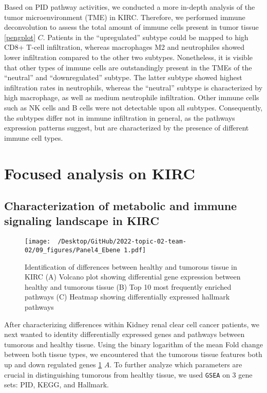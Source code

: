 \documentclass[
  parskip,
  oneside]{scrreprt}
\begin{document}
Based on PID pathway activities, we conducted a more in-depth analysis
of the tumor microenvironment (TME) in KIRC. Therefore, we performed
immune deconvolution to assess the total amount of immune cells present
in tumor tissue \cref{pengplot} \(C\). Patients in the ``upregulated''
subtype could be mapped to high CD8+ T-cell infiltration, whereas
macrophages M2 and neutrophiles showed lower infiltration compared to
the other two subtypes. Nonetheless, it is visible that other types of
immune cells are outstandingly present in the TMEs of the ``neutral''
and ``downregulated'' subtype. The latter subtype showed highest
infiltration rates in neutrophils, whereas the ``neutral'' subtype is
characterized by high macrophage, as well as medium neutrophile
infiltration. Other immune cells such as NK cells and B cells were not
detectable upon all subtypes. Consequently, the subtypes differ not in
immune infiltration in general, as the pathways expression patterns
suggest, but are characterized by the presence of different immune cell
types.

\hypertarget{focused-analysis-on-kirc}{%
\section{Focused analysis on KIRC}\label{focused-analysis-on-kirc}}

\hypertarget{characterization-of-metabolic-and-immune-signaling-landscape-in-kirc}{%
\subsection{Characterization of metabolic and immune signaling landscape
in
KIRC}\label{characterization-of-metabolic-and-immune-signaling-landscape-in-kirc}}

\begin{figure}[h]
  \texttt{[image: ~/Desktop/GitHub/2022-topic-02-team-02/09\_figures/Panel4\_Ebene 1.pdf]}
  \caption{Identification of differences between healthy and tumorous tissue in KIRC (A) Volcano plot showing differential gene expression between healthy and tumorous tissue (B) Top 10 most frequently enriched pathways (C) Heatmap showing differentially expressed hallmark pathways}
  \label{volcano}
\end{figure}

After characterizing differences within Kidney renal clear cell cancer
patients, we next wanted to identity differentially expressed genes and
pathways between tumorous and healthy tissue. Using the binary logarithm
of the mean Fold change between both tissue types, we encountered that
the tumorous tissue features both up and down regulated genes
\cref{volcano} \(A\). To further analyze which parameters are crucial in
distinguishing tumorous from healthy tissue, we used \texttt{GSEA} on 3
gene sets: PID, KEGG, and Hallmark.
\end{document}
